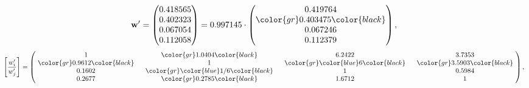 \begin{example}
\begin{equation*}
\mathbf{w}^{\prime} =
\begin{pmatrix}
0.418565\\
0.402323\\
0.067054\\
0.112058
\end{pmatrix} =
0.997145\cdot
\begin{pmatrix}
0.419764\\
\color{gr} 0.403475\color{black} \\
0.067246\\
0.112379
\end{pmatrix},
\end{equation*}
\begin{equation*}
\left[ \frac{{w}^{\prime}_i}{{w}^{\prime}_j} \right] =
\begin{pmatrix}
$\,\,$ 1 $\,\,$ & $\,\,$\color{gr} 1.0404\color{black} $\,\,$ & $\,\,$6.2422$\,\,$ & $\,\,$3.7353$\,\,$ \\
$\,\,$\color{gr} 0.9612\color{black} $\,\,$ & $\,\,$ 1 $\,\,$ & $\,\,$\color{gr} \color{blue} 6\color{black} $\,\,$ & $\,\,$\color{gr} 3.5903\color{black}   $\,\,$ \\
$\,\,$0.1602$\,\,$ & $\,\,$\color{gr} \color{blue}  1/6\color{black} $\,\,$ & $\,\,$ 1 $\,\,$ & $\,\,$0.5984 $\,\,$ \\
$\,\,$0.2677$\,\,$ & $\,\,$\color{gr} 0.2785\color{black} $\,\,$ & $\,\,$1.6712$\,\,$ & $\,\,$ 1  $\,\,$ \\
\end{pmatrix},
\end{equation*}
\end{example}
\newpage

